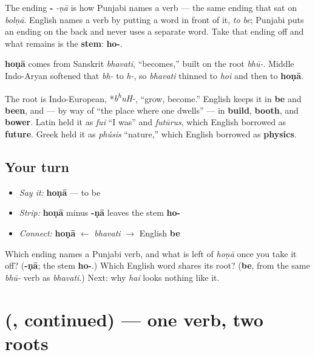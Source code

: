 The ending \textbf{-} \emph{-ṇā} is how Punjabi names a verb — the same ending that sat on \emph{bolṇā}. English names a verb by putting a word in front of it, \emph{to be}; Punjabi puts an ending on the back and never uses a separate word. Take that ending off and what remains is the \textbf{stem}: \textbf{ho-}.

\begin{cousinweb}
\textbf{hoṇā} comes from Sanskrit \emph{bhavati}, “becomes,” built on the root \emph{bhū-}. Middle Indo-Aryan softened that \emph{bh-} to \emph{h-}, so \emph{bhavati} thinned to \emph{hoi} and then to \textbf{hoṇā}.

The root is Indo-European, *\emph{b\textsuperscript{h}uH-}, “grow, become.” English keeps it in \textbf{be} and \textbf{been}, and — by way of “the place where one dwells” — in \textbf{build}, \textbf{booth}, and \textbf{bower}. Latin held it as \emph{fuī} “I was” and \emph{futūrus}, which English borrowed as \textbf{future}. Greek held it as \emph{phúsis} “nature,” which English borrowed as \textbf{physics}.
\end{cousinweb}

\subsection*{Your turn}
\begin{itemize}
\raggedright
  \item \emph{Say it:} \textbf{hoṇā} — to be
  \item \emph{Strip:} \textbf{hoṇā} minus \textbf{-ṇā} leaves the stem \textbf{ho-}
  \item \emph{Connect:} \textbf{hoṇā} $\leftarrow$ \emph{bhavati} $\to$ English \textbf{be}
\end{itemize}

\begin{tcolorbox}[breakable,colback=teal!4,colframe=teal!35!black,title={Before you move on}]
Which ending names a Punjabi verb, and what is left of \emph{hoṇā} once you take it off? (\textbf{-ṇā}; the stem \textbf{ho-}.) Which English word shares its root? (\textbf{be}, from the same \emph{bhū-} verb as \emph{bhavati}.) Next: why \emph{hai} looks nothing like it.
\end{tcolorbox}
\section[\texorpdfstring{(\pa{ਹੋਣਾ}, continued)}{(ਹੋਣਾ, continued)}]{(, continued) — one verb, two roots}

